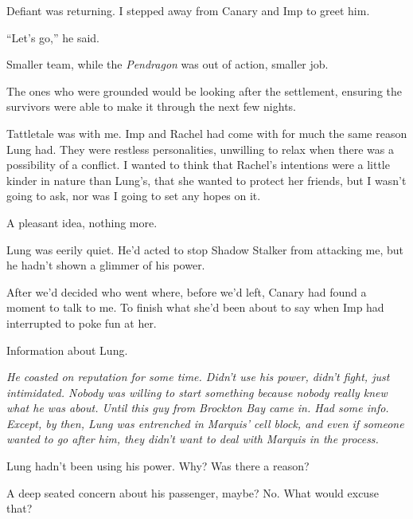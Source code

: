 Defiant was returning.  I stepped away from Canary and Imp to greet him.



``Let's go,'' he said.



\blacksquare



Smaller team, while the \emph{Pendragon }was out of action, smaller job.



The ones who were grounded would be looking after the settlement, ensuring the survivors were able to make it through the next few nights.



Tattletale was with me.  Imp and Rachel had come with for much the same reason Lung had.  They were restless personalities, unwilling to relax when there was a possibility of a conflict.  I wanted to think that Rachel's intentions were a little kinder in nature than Lung's, that she wanted to protect her friends, but I wasn't going to ask, nor was I going to set any hopes on it.



A pleasant idea, nothing more.



Lung was eerily quiet.  He'd acted to stop Shadow Stalker from attacking me, but he hadn't shown a glimmer of his power.



After we'd decided who went where, before we'd left, Canary had found a moment to talk to me.  To finish what she'd been about to say when Imp had interrupted to poke fun at her.



Information about Lung.



\emph{He coasted on reputation for some time.  Didn't use his power, didn't fight, just intimidated.  Nobody was willing to start something because nobody really knew what he was about.  Until this guy from Brockton Bay came in.  Had some info.  Except, by then, Lung was entrenched in Marquis' cell block, and even if someone wanted to go after him, they didn't want to deal with Marquis in the process.}



Lung hadn't been using his power.  Why?  Was there a reason?



A deep seated concern about his passenger, maybe?  No.  What would excuse that?



